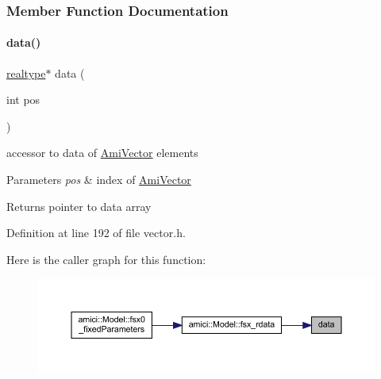 \subsubsection{Member Function Documentation}
\mbox{\label{classamici_1_1_ami_vector_array_a5c1b7077b31d3a3be1370ea3e42d13a3}} 
\paragraph{\texorpdfstring{data()}{data()}\hspace{0.1cm}{\footnotesize\ttfamily [1/2]}}
{\footnotesize\ttfamily \mbox{\hyperlink{namespaceamici_a1bdce28051d6a53868f7ccbf5f2c14a3}{realtype}}$\ast$ data (\begin{DoxyParamCaption}\item[{int}]{pos }\end{DoxyParamCaption})}

accessor to data of \mbox{\hyperlink{classamici_1_1_ami_vector}{Ami\+Vector}} elements 
\begin{DoxyParams}{Parameters}
{\em pos} & index of \mbox{\hyperlink{classamici_1_1_ami_vector}{Ami\+Vector}} \\
\hline
\end{DoxyParams}
\begin{DoxyReturn}{Returns}
pointer to data array 
\end{DoxyReturn}


Definition at line 192 of file vector.\+h.

Here is the caller graph for this function\+:
\nopagebreak
\begin{figure}[H]
\begin{center}
\leavevmode
\includegraphics[width=350pt]{classamici_1_1_ami_vector_array_a5c1b7077b31d3a3be1370ea3e42d13a3_icgraph}
\end{center}
\end{figure}
\mbox{\label{classamici_1_1_ami_vector_array_a862fe8497e94d2fac86e92a07db04cd7}} 
